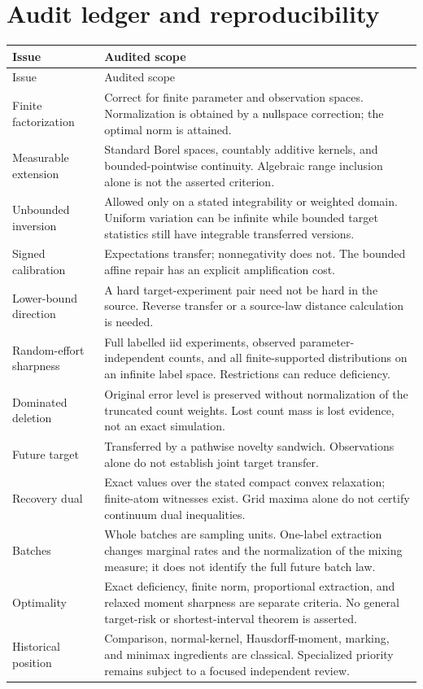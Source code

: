 \documentclass[11pt]{article}
\numberwithin{equation}{section}
\theoremstyle{definition}
\theoremstyle{remark}
\begin{document}
\section{Audit ledger and reproducibility}\label{app:audit}
\begin{longtable}{@{}p{}p{}@{}}
\toprule
Issue & Audited scope\\\midrule\endfirsthead
\toprule Issue & Audited scope\\\midrule\endhead
\bottomrule\endfoot
Finite factorization & Correct for finite parameter and observation spaces. Normalization is obtained by a nullspace correction; the optimal norm is attained.\\[3pt]
Measurable extension & Standard Borel spaces, countably additive kernels, and bounded-pointwise continuity. Algebraic range inclusion alone is not the asserted criterion.\\[3pt]
Unbounded inversion & Allowed only on a stated integrability or weighted domain. Uniform variation can be infinite while bounded target statistics still have integrable transferred versions.\\[3pt]
Signed calibration & Expectations transfer; nonnegativity does not. The bounded affine repair has an explicit amplification cost.\\[3pt]
Lower-bound direction & A hard target-experiment pair need not be hard in the source. Reverse transfer or a source-law distance calculation is needed.\\[3pt]
Random-effort sharpness & Full labelled iid experiments, observed parameter-independent counts, and all finite-supported distributions on an infinite label space. Restrictions can reduce deficiency.\\[3pt]
Dominated deletion & Original error level is preserved without normalization of the truncated count weights. Lost count mass is lost evidence, not an exact simulation.\\[3pt]
Future target & Transferred by a pathwise novelty sandwich. Observations alone do not establish joint target transfer.\\[3pt]
Recovery dual & Exact values over the stated compact convex relaxation; finite-atom witnesses exist. Grid maxima alone do not certify continuum dual inequalities.\\[3pt]
Batches & Whole batches are sampling units. One-label extraction changes marginal rates and the normalization of the mixing measure; it does not identify the full future batch law.\\[3pt]
Optimality & Exact deficiency, finite norm, proportional extraction, and relaxed moment sharpness are separate criteria. No general target-risk or shortest-interval theorem is asserted.\\[3pt]
Historical position & Comparison, normal-kernel, Hausdorff-moment, marking, and minimax ingredients are classical. Specialized priority remains subject to a focused independent review.\\
\end{longtable}
\end{document}
